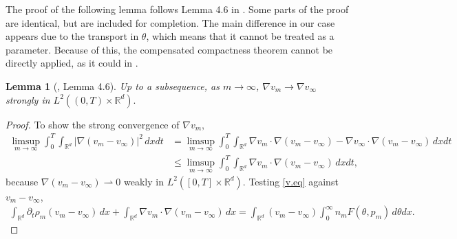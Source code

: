 \documentclass{amsart}
\newtheorem{lemma}[theorem]{Lemma}
\def\R{\mathbb R}
\begin{document}
The proof of the following lemma follows Lemma 4.6 in \cite{david}. Some parts of the proof are identical, but are included for completion. The main difference  in our case appears due to the transport in $\theta$, which means that it cannot be treated as a parameter. Because of this, the compensated compactness theorem cannot be directly applied, as it could in \cite{david}.
\begin{lemma}[\cite{david}, Lemma 4.6]\label{lem.strong_grad}
    Up to a subsequence, as $m \rightarrow \infty$, $\nabla v_m \rightarrow \nabla v_\infty$ strongly in $L^2((0,T)\times \R^d).$
\end{lemma}
\begin{proof}
To show the strong convergence of $\nabla v_m,$
      \begin{align*}
        \limsup_{m  \rightarrow \infty}\int_{0}^{T}\int_{\R^d}|\nabla (v_m-v_\infty)|^2\, dx dt &=\limsup_{m \rightarrow \infty}\int_{0}^{T}\int_{\R^d}\nabla v_m\cdot \nabla (v_m-v_\infty)-\nabla v_\infty\cdot \nabla(v_m-v_\infty)\, dx dt  \nonumber \\&\leq \limsup_{m \rightarrow \infty}\int_{0}^{T}\int_{\R^d}\nabla v_m\cdot \nabla (v_m-v_\infty)\, dx dt,
    \end{align*}
    because $\nabla (v_m-v_\infty)\rightharpoonup 0$ weakly in $L^2([0,T]\times \R^d).$
    Testing \eqref{v.eq} against $v_m-v_\infty$, 
    \begin{align*}
       \int_{\R^d} \partial_t \rho_m(v_m-v_\infty)\, dx +\int_{\R^d}\nabla v_m\cdot \nabla(v_m-v_\infty)\, dx=\int_{\R^d}(v_m-v_\infty)\int_{0}^{\infty}n_mF(\theta,p_m)\, d\theta dx.
    \end{align*}
   

\end{proof}
\end{document}
